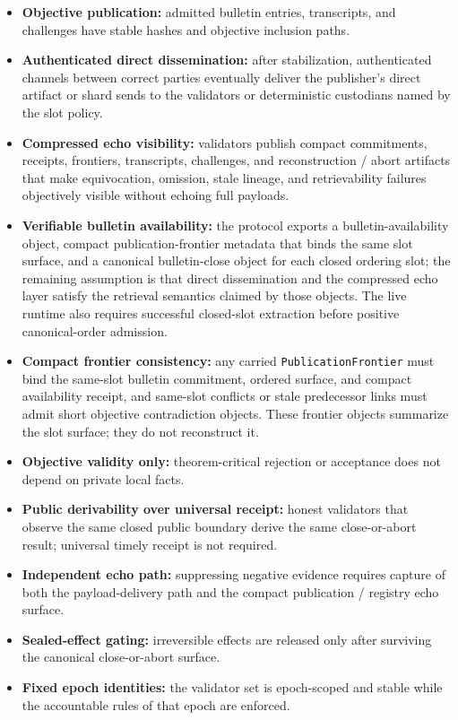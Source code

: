 \documentclass[11pt]{article}
\newcommand{\code}[1]{\texttt{#1}}
\begin{document}
\begin{itemize}[leftmargin=1.5em]
\item \textbf{Objective publication:} admitted bulletin entries, transcripts,
and challenges have stable hashes and objective inclusion paths.
\item \textbf{Authenticated direct dissemination:} after stabilization,
authenticated channels between correct parties eventually deliver the
publisher's direct artifact or shard sends to the validators or deterministic
custodians named by the slot policy.
\item \textbf{Compressed echo visibility:} validators publish compact
commitments, receipts, frontiers, transcripts, challenges, and reconstruction /
abort artifacts that make equivocation, omission, stale lineage, and
retrievability failures objectively visible without echoing full payloads.
\item \textbf{Verifiable bulletin availability:} the protocol exports a
bulletin-availability object, compact publication-frontier metadata that binds
the same slot surface, and a canonical bulletin-close object for each closed
ordering slot; the remaining assumption is that direct dissemination and the
compressed echo layer satisfy the retrieval semantics claimed by those objects.
The live runtime also requires successful closed-slot extraction before
positive canonical-order admission.
\item \textbf{Compact frontier consistency:} any carried
\code{PublicationFrontier} must bind the same-slot bulletin commitment, ordered
surface, and compact availability receipt, and same-slot conflicts or stale
predecessor links must admit short objective contradiction objects. These
frontier objects summarize the slot surface; they do not reconstruct it.
\item \textbf{Objective validity only:} theorem-critical rejection or
acceptance does not depend on private local facts.
\item \textbf{Public derivability over universal receipt:} honest validators
that observe the same closed public boundary derive the same close-or-abort
result; universal timely receipt is not required.
\item \textbf{Independent echo path:} suppressing negative evidence requires
capture of both the payload-delivery path and the compact publication /
registry echo surface.
\item \textbf{Sealed-effect gating:} irreversible effects are released only
after surviving the canonical close-or-abort surface.
\item \textbf{Fixed epoch identities:} the validator set is epoch-scoped and
stable while the accountable rules of that epoch are enforced.
\end{itemize}
\end{document}
